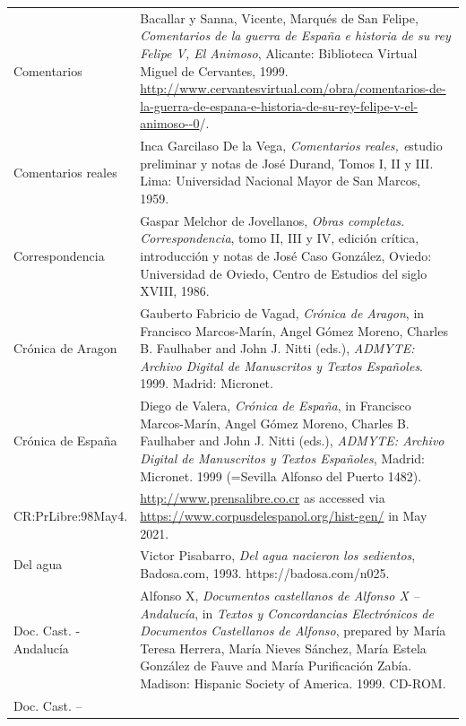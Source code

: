 \documentclass[10pt]{article}
\newcommand\textstyleInternetlink[1]{#1}
\begin{document}
\begin{flushleft}
\begin{supertabular}{m{1.7955599in}m{4.42126in}}
Comentarios\textit{ } &
Bacallar y Sanna, Vicente, Marqués de San Felipe,\textit{ Comentarios de la guerra de España e historia de su rey Felipe V, El Animoso}, Alicante: Biblioteca Virtual Miguel de Cervantes, 1999. \href{http://www.cervantesvirtual.com/obra/comentarios-de-la-guerra-de-espana-e-historia-de-su-rey-felipe-v-el-animoso--0/}{\textstyleInternetlink{http://www.cervantesvirtual.com/obra/comentarios-de-la-guerra-de-espana-e-historia-de-su-rey-felipe-v-el-animoso-{}-0}}/.\\
Comentarios reales  &
Inca Garcilaso De la Vega, \emph{\textmd{\textit{Comentarios reales,}}\textmd{ }\textmd{e}}studio preliminar y notas de José Durand, Tomos I, II y III. Lima: Universidad Nacional Mayor de San Marcos, 1959.\\
Correspondencia  &
Gaspar Melchor de Jovellanos, \textit{Obras completas. Correspondencia}, tomo II, III y IV, edición crítica, introducción y notas de José Caso González, Oviedo: Universidad de Oviedo, Centro de Estudios del siglo XVIII, 1986.\\
Crónica de Aragon  &
Gauberto Fabricio de Vagad,\textit{ Crónica de Aragon}, in Francisco Marcos-Marín, Angel Gómez Moreno, Charles B. Faulhaber and John J. Nitti (eds.), \textit{ADMYTE: Archivo Digital de Manuscritos y Textos Españoles}. 1999. Madrid: Micronet. \\
Crónica de España  &
Diego de Valera, \textit{Crónica de España}, in Francisco Marcos-Marín, Angel Gómez Moreno, Charles B. Faulhaber and John J. Nitti (eds.), \textit{ADMYTE: Archivo Digital de Manuscritos y Textos Españoles},\textit{ }Madrid: Micronet. 1999 (=Sevilla Alfonso del Puerto 1482).\\
CR:PrLibre:98May4.  &
\url{http://www.prensalibre.co.cr} as accessed via \url{https://www.corpusdelespanol.org/hist-gen/} in May 2021.\\
Del agua &
Victor Pisabarro,\textit{ Del agua nacieron los sedientos}, Badosa.com, 1993. https://badosa.com/n025.\\
Doc. Cast. - Andalucía  &
Alfonso X, \textit{Documentos castellanos de Alfonso X – Andalucía}, in \textit{Textos y Concordancias Electrónicos de Documentos }\textit{Castellanos de Alfonso}, prepared by María Teresa Herrera, María Nieves Sánchez, María Estela González de Fauve and María Purificación Zabía. Madison: Hispanic Society of America. 1999. CD-ROM. \\
Doc. Cast. – 


\end{supertabular}
\end{flushleft}
\end{document}
